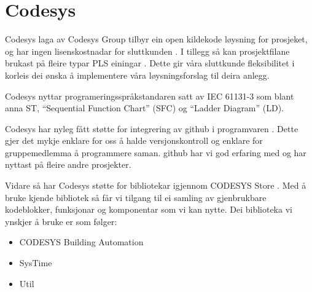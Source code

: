 \section{Codesys}
\thispagestyle{fancy}
Codesys \citep{Codesys} laga av Codesys Group tilbyr ein open kildekode løysning for prosjeket, og har ingen lisenskostnadar for sluttkunden \citep{CodesysLisens}. 
I tillegg så kan prosjektfilane brukast på fleire typar PLS einingar \citep{CodesysPLS}. 
Dette gir våra sluttkunde fleksibilitet i korleis dei ønska å implementere våra løysningsforslag til deira anlegg.

Codesys nyttar programeringsspråkstandaren satt av \gls{IEC} 61131-3 som blant anna \gls{ST}, ``Sequential Function Chart'' (\gls{SFC}) og ``Ladder Diagram'' (\gls{LD}). 

Codesys har nyleg fått støtte for integrering av \gls{github} i programvaren \citep{CodesysGIT}. 
Dette gjer det mykje enklare for oss å halde versjonskontroll
og enklare for gruppemedlemma å programmere saman. 
\gls{github} har vi god erfaring med og har nyttast på fleire andre prosjekter. 

Vidare så har Codesys støtte for bibliotekar igjennom CODESYS Store \citep{CodesysStore}. 
Med å bruke kjende bibliotek så får vi tilgang til ei samling av gjenbrukbare kodeblokker, funksjonar og komponentar som vi kan nytte.
Dei biblioteka vi ynskjer å bruke er som følger:

\begin{itemize}
    \item CODESYS Building Automation \citep{BuildingAutomation}
    \item SysTime \citep{DateAndTime}
    \item Util \citep{Util}
\end{itemize}


\newpage
